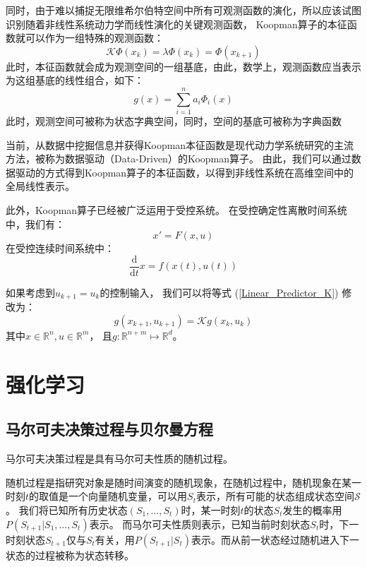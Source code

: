 \documentclass[AutoFakeBold]{LZUThesis}
\begin{document}
同时，由于难以捕捉无限维希尔伯特空间中所有可观测函数的演化，所以应该试图识别随着非线性系统动力学而线性演化的关键观测函数，
Koopman算子的本征函数就可以作为一组特殊的观测函数：
\begin{equation}
  \mathcal{K} \Phi (x_k) = \lambda \Phi(x_k) = \Phi(x_{k + 1})
\end{equation}
此时，本征函数就会成为观测空间的一组基底，由此，数学上，观测函数应当表示为这组基底的线性组合，如下：
\begin{equation}
  g(x) = \sum_{i = 1}^n a_i \Phi_i(x)
\end{equation}
此时，观测空间可被称为状态字典空间，同时，空间的基底可被称为字典函数

当前，从数据中挖掘信息并获得Koopman本征函数是现代动力学系统研究的主流方法，被称为数据驱动（Data-Driven）的Koopman算子。
由此，我们可以通过数据驱动的方式得到Koopman算子的本征函数，以得到非线性系统在高维空间中的全局线性表示。

此外，Koopman算子已经被广泛运用于受控系统。
在受控确定性离散时间系统中，我们有：
\begin{equation}
  x' = F(x, u)
\end{equation}
在受控连续时间系统中：
\begin{equation}
  \frac{\mathrm{d}}{\mathrm{d}t} x = f(x(t), u(t))
\end{equation}

如果考虑到$u_{k + 1} = u_k$的控制输入，
我们可以将等式 (\ref{Linear_Predictor_K}) 修改为：
\begin{equation}
  g(x_{k + 1}, u_{k + 1}) = \mathcal{K} g(x_k, u_k)
\end{equation}
其中$x \in \mathbb{R}^n, u \in \mathbb{R}^m$，
且$g : \mathbb{R}^{n + m} \mapsto \mathbb{R}^d$。




\section{强化学习}

\subsection{马尔可夫决策过程与贝尔曼方程}
马尔可夫决策过程是具有马尔可夫性质的随机过程。

随机过程是指研究对象是随时间演变的随机现象，在随机过程中，随机现象在某一时刻$t$的取值是一个向量随机变量，可以用$S_t$表示，所有可能的状态组成状态空间$\mathcal{S}$。
我们将已知所有历史状态$( S_1,\dots,S_t )$时，某一时刻$t$的状态$S_t$发生的概率用$P( S_{t + 1} | S_1,\dots,S_t )$表示。
而马尔可夫性质则表示，已知当前时刻状态$S_t$时，下一时刻状态$S_{t + 1}$仅与$S_t$有关，用$P( S_{t + 1} | S_t)$表示。而从前一状态经过随机进入下一状态的过程被称为状态转移。
\end{document}
